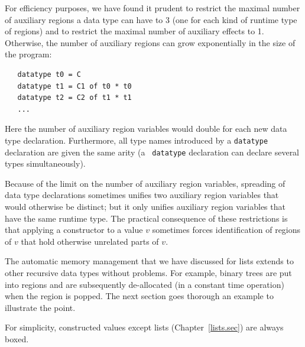 \documentclass[12pt]{book}
\begin{document}
For efficiency purposes, we have found it prudent to restrict the
maximal number of auxiliary regions a data type can have to 3 (one for
each kind of runtime type of regions) and to restrict the maximal
number of auxiliary effects to 1.  Otherwise, the number of auxiliary
regions can grow exponentially in the size of the program:
\begin{verbatim}
   datatype t0 = C
   datatype t1 = C1 of t0 * t0
   datatype t2 = C2 of t1 * t1
   ...
\end{verbatim}
Here the number of auxiliary region variables would double for each
new data type declaration.  Furthermore, all type names introduced by
a {\tt datatype} declaration are given the same arity (a {\tt
  datatype} declaration can declare several types simultaneously).

Because of the limit on the number of auxiliary region variables,
spreading of data type declarations sometimes unifies two auxiliary
region variables that would otherwise be distinct; but it only unifies
auxiliary region variables that have the same runtime type. The
practical consequence of these restrictions is that applying a
constructor to a value $v$ sometimes forces identification of regions
of $v$ that hold otherwise unrelated parts of $v$.

The automatic memory management that we have discussed for lists
extends to other recursive data types without problems. For example,
binary trees are put into regions and are subsequently de-allocated
(in a constant time operation) when the region is popped. The next
section goes thorough an example to illustrate the point.

For simplicity, constructed values except lists
(Chapter~\ref{lists.sec}) are always boxed.
\end{document}
